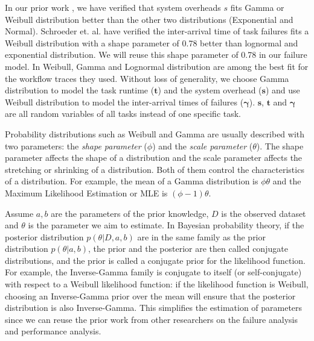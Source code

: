 


In our prior work \cite{Chen2011}, we have verified that system overheads $s$ fits Gamma or Weibull distribution better than the other two distributions (Exponential and Normal). Schroeder et. al. \cite{Schroeder2006} have verified the inter-arrival time of task failures fits a Weibull distribution with a shape parameter of 0.78 better than lognormal and exponential distribution. We will reuse this shape parameter of 0.78 in our failure model. 
In \cite{Sun2003, Iosup2008} Weibull, Gamma and Lognormal distribution are among the best fit for the workflow traces they used.  Without loss of generality, we choose Gamma distribution to model the task runtime ($\bm t$) and the system overhead ($\bm s$) and use Weibull distribution to model the inter-arrival times of failures ($\bm\gamma$).  $\bm s$, $\bm t$ and $\bm \gamma$ are all random variables of all tasks instead of one specific task. 

Probability distributions such as Weibull and Gamma are usually described with two parameters: the \emph{shape parameter} ($\phi$) and the \emph{scale parameter} ($\theta$). The shape parameter affects the shape of a distribution and the scale parameter affects the stretching or shrinking of a distribution. Both of them control the characteristics of a distribution. For example, the mean of a Gamma distribution is $\phi\theta$ and the Maximum Likelihood Estimation or MLE is $(\phi-1)\theta$. 

Assume $a,b$ are the parameters of the prior knowledge, $D$ is the observed dataset and $\theta$ is the parameter we aim to estimate. In Bayesian probability theory, if the posterior distribution $p(\theta|D, a, b)$ are in the same family as the prior distribution $p(\theta|a, b)$, the prior and the posterior are then called conjugate distributions, and the prior is called a conjugate prior for the likelihood function. For example, the Inverse-Gamma family is conjugate to itself (or self-conjugate) with respect to a Weibull likelihood function: if the likelihood function is Weibull, choosing an Inverse-Gamma prior over the mean will ensure that the posterior distribution is also Inverse-Gamma. This simplifies the estimation of parameters since we can reuse the prior work from other researchers \cite{Schroeder2006, Iosup2008, Sun2003, Chen2011} on the failure analysis and performance analysis. 

